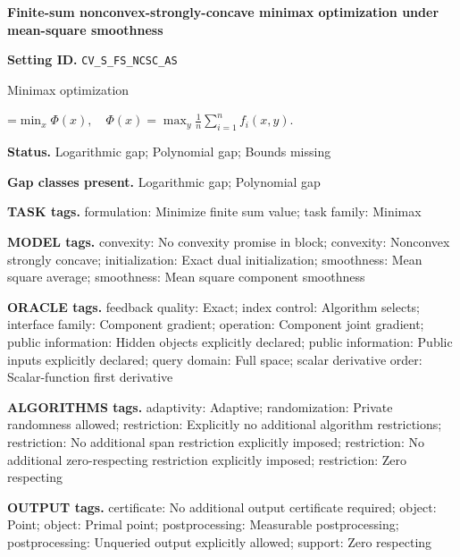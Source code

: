 \documentclass[10pt,a4paper]{article}
\newcommand{\AtlasMath}[1]{\par\begingroup\centering\setbox0=\hbox{$\displaystyle #1$}\ifdim\wd0>1.4\linewidth\typeout{ATLAS WIDE FORMULA: \the\wd0}\fi\ifdim\wd0>\linewidth\resizebox{\linewidth}{!}{\box0}\else\box0\fi\par\endgroup}
\begin{document}
\raggedright

{\LARGE\bfseries\sffamily\color{AtlasNavy} Finite-sum nonconvex-strongly-concave minimax optimization under mean-square smoothness\par}\vspace{5pt}


\textbf{Setting ID.} \texttt{CV\_\allowbreak{}S\_\allowbreak{}FS\_\allowbreak{}NCSC\_\allowbreak{}AS}



Minimax optimization




\AtlasMath{\min_x\Phi(x),\quad\Phi(x)=\max_y\frac1n\sum_{i=1}^n f_i(x,y).}




\textbf{Status.} Logarithmic gap; Polynomial gap; Bounds missing



\textbf{Gap classes present.} Logarithmic gap; Polynomial gap



\textbf{TASK tags.} formulation: Minimize finite sum value; task family: Minimax



\textbf{MODEL tags.} convexity: No convexity promise in block; convexity: Nonconvex strongly concave; initialization: Exact dual initialization; smoothness: Mean square average; smoothness: Mean square component smoothness



\textbf{ORACLE tags.} feedback quality: Exact; index control: Algorithm selects; interface family: Component gradient; operation: Component joint gradient; public information: Hidden objects explicitly declared; public information: Public inputs explicitly declared; query domain: Full space; scalar derivative order: Scalar-function first derivative



\textbf{ALGORITHMS tags.} adaptivity: Adaptive; randomization: Private randomness allowed; restriction: Explicitly no additional algorithm restrictions; restriction: No additional span restriction explicitly imposed; restriction: No additional zero-respecting restriction explicitly imposed; restriction: Zero respecting



\textbf{OUTPUT tags.} certificate: No additional output certificate required; object: Point; object: Primal point; postprocessing: Measurable postprocessing; postprocessing: Unqueried output explicitly allowed; support: Zero respecting
\end{document}
